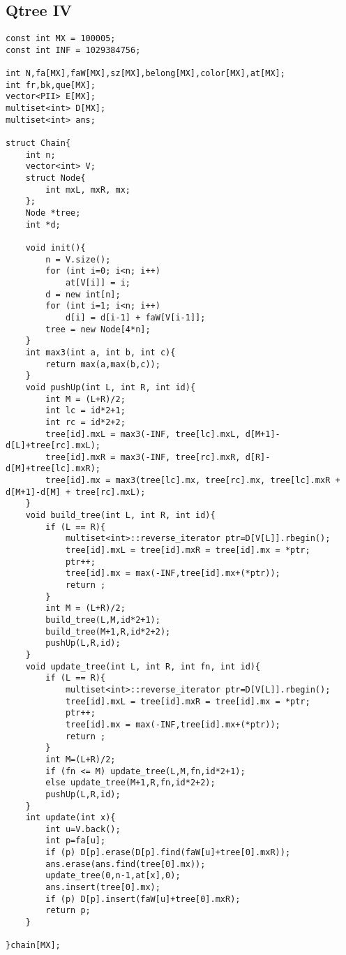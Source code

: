 \documentclass[10pt,twocolumn,oneside]{article}
\begin{document}
\subsection {Qtree IV}
\begin{lstlisting}
const int MX = 100005;
const int INF = 1029384756;

int N,fa[MX],faW[MX],sz[MX],belong[MX],color[MX],at[MX];
int fr,bk,que[MX];
vector<PII> E[MX];
multiset<int> D[MX];
multiset<int> ans;

struct Chain{
	int n;
	vector<int> V;
	struct Node{
		int mxL, mxR, mx;
	};
	Node *tree;
	int *d;

	void init(){
		n = V.size();
		for (int i=0; i<n; i++)
			at[V[i]] = i;
		d = new int[n];
		for (int i=1; i<n; i++)
			d[i] = d[i-1] + faW[V[i-1]];
		tree = new Node[4*n];
	}
	int max3(int a, int b, int c){
		return max(a,max(b,c));
	}
	void pushUp(int L, int R, int id){
		int M = (L+R)/2;
		int lc = id*2+1;
		int rc = id*2+2;
		tree[id].mxL = max3(-INF, tree[lc].mxL, d[M+1]-d[L]+tree[rc].mxL);
		tree[id].mxR = max3(-INF, tree[rc].mxR, d[R]-d[M]+tree[lc].mxR);
		tree[id].mx = max3(tree[lc].mx, tree[rc].mx, tree[lc].mxR + d[M+1]-d[M] + tree[rc].mxL);
	}
	void build_tree(int L, int R, int id){
		if (L == R){
			multiset<int>::reverse_iterator ptr=D[V[L]].rbegin();
			tree[id].mxL = tree[id].mxR = tree[id].mx = *ptr;
			ptr++;
			tree[id].mx = max(-INF,tree[id].mx+(*ptr));
			return ;
		}
		int M = (L+R)/2;
		build_tree(L,M,id*2+1);
		build_tree(M+1,R,id*2+2);
		pushUp(L,R,id);
	}
	void update_tree(int L, int R, int fn, int id){
		if (L == R){
			multiset<int>::reverse_iterator ptr=D[V[L]].rbegin();
			tree[id].mxL = tree[id].mxR = tree[id].mx = *ptr;
			ptr++;
			tree[id].mx = max(-INF,tree[id].mx+(*ptr));
			return ;
		}
		int M=(L+R)/2;
		if (fn <= M) update_tree(L,M,fn,id*2+1);
		else update_tree(M+1,R,fn,id*2+2);
		pushUp(L,R,id);
	}
	int update(int x){
		int u=V.back();
		int p=fa[u];
		if (p) D[p].erase(D[p].find(faW[u]+tree[0].mxR));
		ans.erase(ans.find(tree[0].mx));
		update_tree(0,n-1,at[x],0);
		ans.insert(tree[0].mx);
		if (p) D[p].insert(faW[u]+tree[0].mxR);
		return p;
	}

}chain[MX];


\end{lstlisting}
\end{document}
